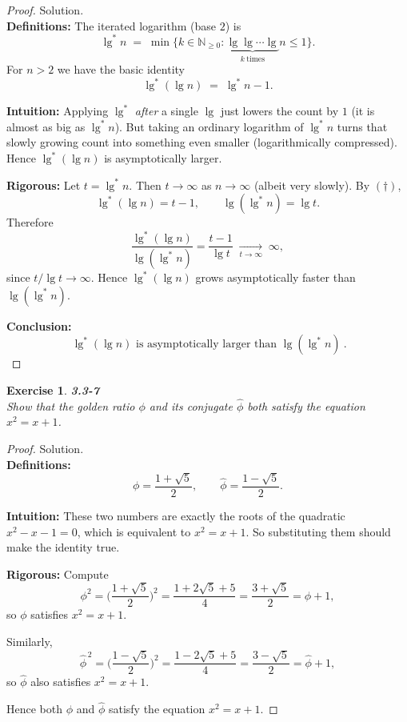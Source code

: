 \documentclass[12pt]{article}
\newtheorem{exercise}[theorem]{Exercise}
\theoremstyle{definition}
\begin{document}
\begin{proof}
Solution. \\

\noindent
\textbf{Definitions:}
The iterated logarithm (base $2$) is
\[
\lg^{*} n \;=\; \min\{k\in\mathbb{N}_{\ge 0} : \underbrace{\lg\lg\cdots\lg}_{k\ \text{times}} n \le 1\}.
\]
For $n>2$ we have the basic identity
\[
\lg^{*}(\lg n) \;=\; \lg^{*} n - 1.
\tag{$\dagger$}
\]

\noindent
\textbf{Intuition:}
Applying $\lg^{*}$ \emph{after} a single $\lg$ just lowers the count by $1$ (it is almost as big as $\lg^{*} n$).
But taking an ordinary logarithm of $\lg^{*} n$ turns that slowly growing count into something
even smaller (logarithmically compressed). Hence $\lg^{*}(\lg n)$ is asymptotically larger.

\noindent
\textbf{Rigorous:}
Let $t=\lg^{*} n$. Then $t\to\infty$ as $n\to\infty$ (albeit very slowly). By $(\dagger)$,
\[
\lg^{*}(\lg n)=t-1,
\qquad
\lg(\lg^{*} n)=\lg t.
\]
Therefore
\[
\frac{\lg^{*}(\lg n)}{\lg(\lg^{*} n)}
=\frac{t-1}{\lg t}
\;\xrightarrow[t\to\infty]{}\;\infty,
\]
since $t/\lg t\to\infty$. Hence $\lg^{*}(\lg n)$ grows asymptotically faster than $\lg(\lg^{*} n)$.

\medskip
\noindent
\textbf{Conclusion:}
\[
\boxed{\ \lg^{*}(\lg n) \text{ is asymptotically larger than } \lg(\lg^{*} n)\ }.
\]
\end{proof}

\newpage

\begin{exercise}
\noindent
\textbf{3.3-7} \\
Show that the golden ratio $\phi$ and its conjugate $\hat{\phi}$ both satisfy the equation $x^2=x+1$.
\end{exercise}

\begin{proof}
Solution. \\

\noindent
\textbf{Definitions:}
\[
\phi=\frac{1+\sqrt{5}}{2}, \qquad \hat{\phi}=\frac{1-\sqrt{5}}{2}.
\]

\noindent
\textbf{Intuition:}
These two numbers are exactly the roots of the quadratic $x^2-x-1=0$, which is equivalent to $x^2=x+1$.
So substituting them should make the identity true.

\noindent
\textbf{Rigorous:}
Compute
\[
\phi^2=\Big(\frac{1+\sqrt{5}}{2}\Big)^2
=\frac{1+2\sqrt{5}+5}{4}
=\frac{3+\sqrt{5}}{2}
=\phi+1,
\]
so $\phi$ satisfies $x^2=x+1$.

Similarly,
\[
\hat{\phi}^{\,2}=\Big(\frac{1-\sqrt{5}}{2}\Big)^2
=\frac{1-2\sqrt{5}+5}{4}
=\frac{3-\sqrt{5}}{2}
=\hat{\phi}+1,
\]
so $\hat{\phi}$ also satisfies $x^2=x+1$.

Hence both $\phi$ and $\hat{\phi}$ satisfy the equation $x^2=x+1$.
\end{proof}
\end{document}

